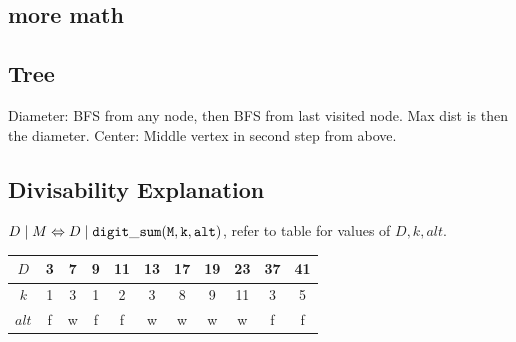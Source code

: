 \documentclass[10pt,a4paper,ngerman,oneside,]{article}
\begin{document}
\begin{multicols}{2}

\newcommand{\hash}[1]{{\bfseries MD5:} ~\texttt{#1}}


\section{more math}
\subsection{Tree}
Diameter: BFS from any node, then BFS from last visited node.
Max dist is then the diameter.
Center: Middle vertex in second step from above.
\subsection{Divisability Explanation}
$D \mid M \Leftrightarrow D \mid {\tt digit\_sum(M, k, alt)}$, refer to table for values of $D, k, alt$.
\begin{table}[htbp]
\begin{tabular}{| c || c | c | c | c | c | c | c | c | c | c |}
\hline
$D$ & 3 & 7 & 9 & 11 & 13 & 17 & 19 & 23 & 37 & 41 \\
\hline
$k$ & 1 & 3 & 1 & 2 & 3 & 8 & 9 & 11 & 3 & 5 \\
\hline
$alt$ & f & w & f & f & w & w & w & w & f & f \\ 
\hline
\end{tabular}
\end{table}

\end{multicols}
\end{document}
